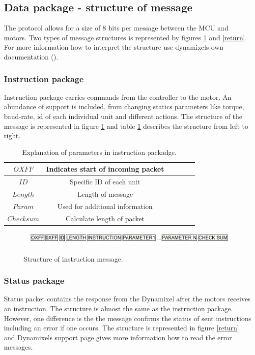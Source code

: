 \subsection{Data package - structure of message}
The protocol allows for a size of 8 bits per message between the MCU and motors. 
Two types of message structures is represented by figures \ref{instr} and \ref{return}.
For more information how to interpret the structure use dynamixels own documentation ().

\subsubsection{Instruction package}
Instruction package carries commands from the controller to the motor.
An abundance of support is included,
from changing statics parameters like torque, baud-rate, id of each individual unit and different actions. 
The structure of the message is represented in figure \ref{instr} and table \ref{instr_table} describes the structure from left to right. 

\begin{table}[H]
    \centering
    \caption{Explanation of parameters in instruction packadge.}
    \begin{tabular}{c | c c c c c}
        \(OXFF\) & Indicates start of incoming packet  \\
        \hline
        \(ID\) & Specific ID of each unit  \\
        \hline
        \(Length\) & Length of message \\
        \hline
        \(Param\) & Used for additional information  \\
        \hline
        \(Check sum\) & Calculate length of packet \\
        \hline
    \end{tabular}
    \label{instr_table}
\end{table}

\begin{figure}[H]
    \graphicspath{ {img/} }
    \centering
    
    \includegraphics[width = 9 cm]{img/instruction_packadge}
    \label{instr}
    \caption{Structure of instruction message.}
\end{figure}

\subsubsection{Status package}
Status packet contains the response from the Dynamixel after the motors receives an instruction.
The structure is almost the same as the instruction package.
However, one difference is the the message confirms the status of sent instructions including an error if one occurs.
The structure is represented in figure \ref{return} and Dynamixels support page \cite{protocol1} gives more information how to read the error messages.

